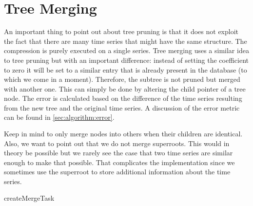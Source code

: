 \section{Tree Merging}
\label{sec:algorithm:merge}

An important thing to point out about tree pruning is that it does not exploit the fact that there are many time series that might have the same structure. The compression is purely executed on a single series. Tree merging uses a similar idea to tree pruning but with an important difference: instead of setting the coefficient to zero it will be set to a similar entry that is already present in the database (to which we come in a moment). Therefore, the subtree is not pruned but merged with another one. This can simply be done by altering the child pointer of a tree node. The error is calculated based on the difference of the time series resulting from the new tree and the original time series. A discussion of the error metric can be found in \autoref{sec:algorithm:error}.

Keep in mind to only merge nodes into others when their children are identical. Also, we want to point out that we do not merge superroots. This would in theory be possible but we rarely see the case that two time series are similar enough to make that possible. That complicates the implementation since we sometimes use the superroot to store additional information about the time series.

\begin{algorithm}



    \caption{createMergeTask}\label{algo:createMergeTask}
\end{algorithm}

